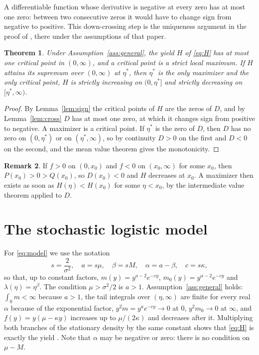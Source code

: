 \documentclass[11pt]{article}
\newtheorem{theorem}{Theorem}[section]
\theoremstyle{definition}
\newtheorem{remark}[theorem]{Remark}
\begin{document}
A differentiable function whose derivative is negative at every zero has at most one zero: between two
consecutive zeros it would have to change sign from negative to positive. This down-crossing step is the
uniqueness argument in the proof of \cite[Lemma~5.4]{ekstrom26}, there under the assumptions of that paper.

\begin{theorem}\label{thm:general}
Under Assumption~\ref{ass:general}, the yield $H$ of \eqref{eq:H} has at most one critical point in $(0,\infty)$,
and a critical point is a strict local maximum. If $H$ attains its supremum over $(0,\infty)$ at $\eta^*$, then
$\eta^*$ is the only maximizer and the only critical point, $H$ is strictly increasing on $(0,\eta^*]$ and strictly
decreasing on $[\eta^*,\infty)$.
\end{theorem}

\begin{proof}
By Lemma~\ref{lem:sign} the critical points of $H$ are the zeros of $D$, and by Lemma~\ref{lem:cross} $D$ has at
most one zero, at which it changes sign from positive to negative. A maximizer is a critical point. If $\eta^*$ is
the zero of $D$, then $D$ has no zero on $(0,\eta^*)$ or on $(\eta^*,\infty)$, so by continuity $D > 0$ on the
first and $D < 0$ on the second, and the mean value theorem gives the monotonicity.
\end{proof}

\begin{remark}
If $f > 0$ on $(0,x_0)$ and $f < 0$ on $(x_0,\infty)$ for some $x_0$, then $P(x_0) > 0 > Q(x_0)$, so
$D(x_0) < 0$ and $H$ decreases at $x_0$. A maximizer then exists as soon as $H(\eta) < H(x_0)$ for some
$\eta < x_0$, by the intermediate value theorem applied to $D$.
\end{remark}

\section{The stochastic logistic model}\label{sec:logistic}

For \eqref{eq:model} we use the notation
\[
  s = \frac{2}{\sigma^2},\quad a = s\mu,\quad \beta = sM,\quad \alpha = a - \beta,\quad c = s\kappa,
\]
so that, up to constant factors, $m(y) = y^{a-2}e^{-cy}$, $m_0(y) = y^{\alpha-2}e^{-cy}$ and
$\lambda(\eta) = \eta^{\beta}$. The condition $\mu > \sigma^2/2$ is $a > 1$. Assumption~\ref{ass:general} holds:
$\int_0 m < \infty$ because $a > 1$, the tail integrals over $(\eta,\infty)$ are finite for every real $\alpha$
because of the exponential factor, $y^2 m = y^a e^{-cy} \to 0$ at $0$, $y^2 m_0 \to 0$ at $\infty$, and
$f(y) = y(\mu - \kappa y)$ increases up to $\mu/(2\kappa)$ and decreases after it. Multiplying both branches of
the stationary density \cite[eq.~(4.3)]{hening19} by the same constant shows that \eqref{eq:H} is exactly the
yield \cite[eq.~(4.4)]{hening19}. Note that $\alpha$ may be negative or zero: there is no condition on
$\mu - M$.
\end{document}
